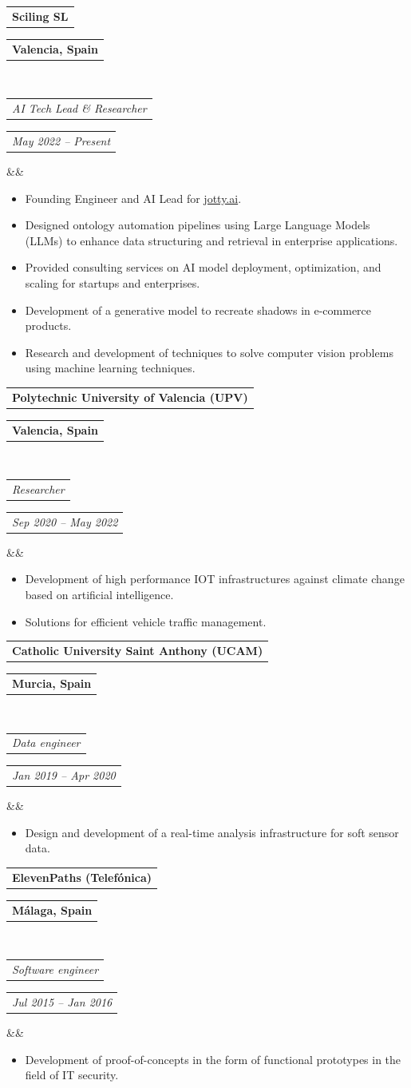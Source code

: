 \documentclass[11pt,a4paper,roman]{moderncv}        %
\makeatletter
\newcommand*{\customcventry}[7][.25em]{
  \begin{tabular}{@{}l} 
    {\bfseries #4}
  \end{tabular}
  \hfill%
  \begin{tabular}{l@{}}
     {\bfseries #5}
  \end{tabular} \\
  \begin{tabular}{@{}l} 
    {\itshape #3}
  \end{tabular}
  \hfill%
  \begin{tabular}{l@{}}
     {\itshape #2}
  \end{tabular}
  \ifx&#7&%
  \else{\\%
    \begin{minipage}{\maincolumnwidth}%
      \small#7%
    \end{minipage}}\fi%
  \par\addvspace{#1}}
\makeatother
\begin{document}
{\customcventry{May 2022 -- Present}{AI Tech Lead \& Researcher}{Sciling SL}{Valencia, Spain}{}{}
\begin{itemize}
    \item Founding Engineer and AI Lead for \href{https://www.jotty.ai}{jotty.ai}.
    \item Designed ontology automation pipelines using Large Language Models (LLMs) to enhance data structuring and retrieval in enterprise applications.
    \item Provided consulting services on AI model deployment, optimization, and scaling for startups and enterprises.
    \item Development of a generative model to recreate shadows in e-commerce products.
    \item Research and development of techniques to solve computer vision problems using machine learning techniques.
  \end{itemize}
}
\vspace{3mm}

{\customcventry{Sep 2020 -- May 2022}{Researcher}{Polytechnic University of Valencia (UPV)}{Valencia, Spain}{}{}
\begin{itemize}
    \item  Development of high performance IOT infrastructures against climate change based on artificial intelligence.
    \item  Solutions for efficient vehicle traffic management.
  \end{itemize}
}
\vspace{3mm}
{\customcventry{Jan 2019 -- Apr 2020}{Data engineer}{Catholic University Saint Anthony (UCAM)}{Murcia, Spain}{}{}
{\begin{itemize}
    \item Design and development of a real-time analysis infrastructure for soft sensor data.
\end{itemize}}}

\vspace{3mm}

{\customcventry{Jul 2015 -- Jan 2016}{Software engineer}{ElevenPaths (Telefónica)}{Málaga, Spain}{}{}
{\begin{itemize}
    \item Development of proof-of-concepts in the form of functional prototypes in the field of IT security.
\end{itemize}}}

\vspace{3mm}
\end{document}
